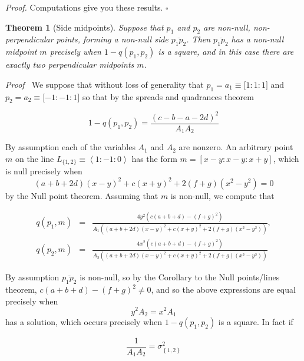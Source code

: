 \documentclass[11pt]{article}
\newtheorem{theorem}{Theorem}
\begin{document}
\textit{Proof. }Computations give you these results. $\square $

\begin{theorem}[Side midpoints]
Suppose that $p_{1}$ and $p_{2}$ are non-null, non-perpendicular points,
forming a non-null side $\overline{p_{1}p_{2}}$. Then $\overline{p_{1}p_{2}}$
has a non-null midpoint $m$ precisely when $1-q(p_{1},p_{2})$ is a square,
and in this case there are exactly two perpendicular midpoints $m$.
\end{theorem}

\textit{Proof \ }We suppose that without loss of generality that $%
p_{1}=a_{1}\equiv \lbrack 1:1:1]$ and $p_{2}=a_{2}\equiv \lbrack -1:-1:1]$
so that by the spreads and quadrances theorem

\begin{equation*}
1-q(p_{1},p_{2})=\frac{(c-b-a-2d)^{2}}{A_{1}A_{2}}
\end{equation*}

By assumption each of the variables $A_{1}$ and $A_{2}$ are nonzero. An
arbitrary point $m$ on the line $L_{\{1,2\}}\equiv \left\langle
1:-1:0\right\rangle $ has the form $m=[x-y:x-y:x+y]$, which is null
precisely when 
\begin{equation*}
(a+b+2d)(x-y)^{2}+c(x+y)^{2}+2\left( f+g\right) (x^{2}-y^{2})=0
\end{equation*}
by the Null point theorem. Assuming that $m$ is non-null, we compute that

\begin{eqnarray*}
q(p_{1},m) &=&\frac{4y^{2}\left( c\left( a+b+d\right) -\left( f+g\right)
^{2}\right) }{A_{1}\left( (a+b+2d)(x-y)^{2}+c(x+y)^{2}+2\left( f+g\right)
(x^{2}-y^{2})\right) }, \\
q(p_{2},m) &=&\frac{4x^{2}\left( c\left( a+b+d\right) -\left( f+g\right)
^{2}\right) }{A_{2}\left( (a+b+2d)(x-y)^{2}+c(x+y)^{2}+2\left( f+g\right)
(x^{2}-y^{2})\right) }
\end{eqnarray*}%
\linebreak

By assumption $\overline{p_{1}p_{2}}$ is non-null, so by the Corollary to
the Null points/lines theorem, $c\left( a+b+d\right) -\left( f+g\right)
^{2}\neq 0$, and so the above expressions are equal precisely when 
\begin{equation*}
y^{2}A_{2}=x^{2}A_{1}
\end{equation*}
has a solution, which occurs precisely when $1-q(p_{1},p_{2})$ is a square.
In fact if

\begin{equation*}
\frac{1}{A_{1}A_{2}}=\sigma _{\left\{ 1,2\right\} }^{2}
\end{equation*}
\end{document}
